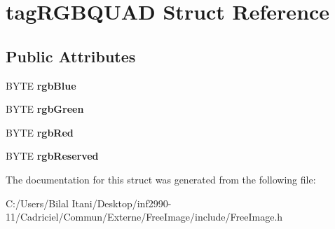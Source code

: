\hypertarget{structtag_r_g_b_q_u_a_d}{}\section{tag\+R\+G\+B\+Q\+U\+AD Struct Reference}
\label{structtag_r_g_b_q_u_a_d}
\subsection*{Public Attributes}
\begin{DoxyCompactItemize}
\item 
B\+Y\+TE {\bfseries rgb\+Blue}\hypertarget{structtag_r_g_b_q_u_a_d_ad99c50770a73c6fae3ee1ea627da1c60}{}\label{structtag_r_g_b_q_u_a_d_ad99c50770a73c6fae3ee1ea627da1c60}

\item 
B\+Y\+TE {\bfseries rgb\+Green}\hypertarget{structtag_r_g_b_q_u_a_d_a4dae0a7db2f4d432cb4da3de4ef337bd}{}\label{structtag_r_g_b_q_u_a_d_a4dae0a7db2f4d432cb4da3de4ef337bd}

\item 
B\+Y\+TE {\bfseries rgb\+Red}\hypertarget{structtag_r_g_b_q_u_a_d_aa143fcd3ff08a04b152bee9d410821a6}{}\label{structtag_r_g_b_q_u_a_d_aa143fcd3ff08a04b152bee9d410821a6}

\item 
B\+Y\+TE {\bfseries rgb\+Reserved}\hypertarget{structtag_r_g_b_q_u_a_d_a2758aec56e37d4f3f5fde511a58f4f82}{}\label{structtag_r_g_b_q_u_a_d_a2758aec56e37d4f3f5fde511a58f4f82}

\end{DoxyCompactItemize}


The documentation for this struct was generated from the following file\+:\begin{DoxyCompactItemize}
\item 
C\+:/\+Users/\+Bilal Itani/\+Desktop/inf2990-\/11/\+Cadriciel/\+Commun/\+Externe/\+Free\+Image/include/Free\+Image.\+h\end{DoxyCompactItemize}
